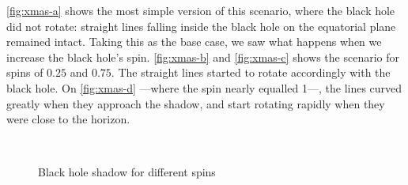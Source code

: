 \autoref{fig:xmas-a} shows the most simple version of this scenario, where the black hole did not rotate: straight lines falling inside the black hole on the equatorial plane remained intact. Taking this as the base case, we saw what happens when we increase the black hole's spin. \autoref{fig:xmas-b} and \autoref{fig:xmas-c} shows the scenario for spins of $0.25$ and $0.75$. The straight lines started to rotate accordingly with the black hole. On \autoref{fig:xmas-d} ---where the spin nearly equalled 1---, the lines curved greatly when they approach the shadow, and start rotating rapidly when they were close to the horizon.

\begin{figure}[bth]
	\myfloatalign
	 \quad
	 \\
	 \quad
	\caption[Black hole shadow for different spins]{Black hole shadow for different spins}\label{fig:xmas}
\end{figure}

